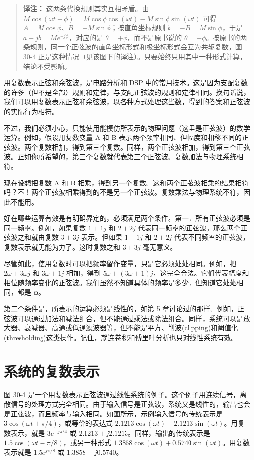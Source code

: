 \begin{quote}
\textbf{译注：} 这两条代换规则其实互相矛盾。由
\(M\cos(\omega t+\phi) = M\cos\phi\cos(\omega t) - M\sin\phi\sin(\omega t)\)
可得 \(A = M\cos\phi\)、\(B = -M\sin\phi\)；按直角坐标规则
\(b = -B = M\sin\phi\)，于是 \(a+jb = Me^{+j\phi}\)，对应的是
\(\theta = +\phi\)，而不是原书说的
\(\theta = -\phi\)。按原书的两条规则，同一个正弦波的直角坐标形式和极坐标形式会互为共轭复数，图
30-4
正是这种情况（见该图下的译注）。只要始终只用其中一种形式计算，结论不受影响。
\end{quote}

用复数表示正弦和余弦波，是电路分析和 DSP
中的常用技术。这是因为支配复数的许多（但不是全部）规则和定律，与支配正弦波的规则和定律相同。换句话说，我们可以用复数表示正弦和余弦波，以各种方式处理这些数，得到的答案和正弦波的实际行为相符。

不过，我们必须小心，只能使用能模仿所表示的物理问题（这里是正弦波）的数学运算。例如，假设用复数变量
A 和 B
表示两个频率相同、但幅度和相移不同的正弦波。两个复数相加，得到第三个复数。同样，两个正弦波相加，得到第三个正弦波。正如你所希望的，第三个复数就代表第三个正弦波。复数加法与物理系统相符。

现在设想把复数 A 和 B
相乘，得到另一个复数。这和两个正弦波相乘的结果相符吗？不！两个正弦波相乘得到的不是另一个正弦波。复数乘法与物理系统不符，因此不能用。

好在哪些运算有效是有明确界定的，必须满足两个条件。第一，所有正弦波必须是同一频率。例如，如果复数
\(1+1j\) 和 \(2+2j\) 代表同一频率的正弦波，那么两个正弦波之和就由复数
\(3+3j\) 表示。但如果 \(1+1j\) 和 \(2+2j\)
代表不同频率的正弦波，复数表示就无能为力了。这时复数之和 \(3+3j\)
毫无意义。

尽管如此，使用复数时可以把频率留作变量，只是它必须处处相同。例如，把
\(2\omega + 3\omega j\) 和 \(3\omega + 1j\) 相加，得到
\(5\omega + (3\omega + 1)j\)，这完全合法。它们代表幅度和相位随频率变化的正弦波。我们虽然不知道具体的频率是多少，但知道它处处相同，都是
ω。

第二个条件是，所表示的运算必须是线性的，如第 5
章讨论过的那样。例如，正弦波可以通过加法和减法组合，但不能通过乘法或除法组合。同样，系统可以是放大器、衰减器、高通或低通滤波器等，但不能是平方、削波(clipping)和阈值化(thresholding)这类操作。记住，就连卷积和傅里叶分析也只对线性系统有效。

\section{系统的复数表示}

图 30-4
是一个用复数表示正弦波通过线性系统的例子。这个例子用连续信号，离散信号的处理方式完全相同。由于输入信号是正弦波，系统又是线性的，输出也会是正弦波，而且频率与输入相同。如图所示，示例输入信号的传统表示是
\(3\cos(\omega t + \pi/4)\)，或等价的表达式
\(2.1213\cos(\omega t) - 2.1213\sin(\omega t)\)。用复数表示，就是
\(3e^{-j\pi/4}\) 或 \(2.1213 + j2.1213\)。同样，输出的传统表示是
\(1.5\cos(\omega t - \pi/8)\)，或另一种形式
\(1.3858\cos(\omega t) + 0.5740\sin(\omega t)\)。用复数表示就是
\(1.5e^{j\pi/8}\) 或 \(1.3858 - j0.5740\)。

